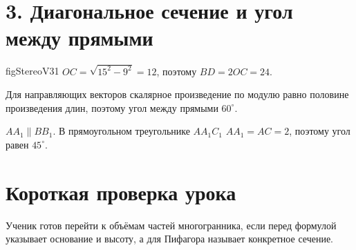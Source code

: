 \section*{3. Диагональное сечение и угол между прямыми}

{\csname figStereoV31\endcsname}
{\(OC=\sqrt{15^2-9^2}=12\), поэтому \(BD=2OC=24\).}

{Для направляющих векторов скалярное произведение по модулю равно половине
произведения длин, поэтому угол между прямыми \(60^\circ\).}

{\(AA_1\parallel BB_1\). В прямоугольном треугольнике \(AA_1C_1\)
\(AA_1=AC=2\), поэтому угол равен \(45^\circ\).}

\ifteacher
\section*{Короткая проверка урока}
Ученик готов перейти к объёмам частей многогранника, если перед формулой
указывает основание и высоту, а для Пифагора называет конкретное сечение.
\fi


